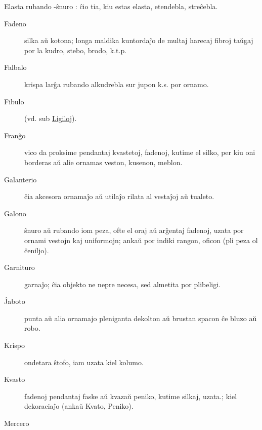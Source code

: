 Elasta rubando -ŝnuro : ĉio tia, kiu estas elasta, etendebla, streĉebla.

\begin{description}
\item[Fadeno]

 silka aŭ kotona; longa maldika kuntordaĵo de multaj harecaj fibroj taŭgaj por la kudro, stebo, brodo, k.t.p.

\item[Falbalo]

 krispa larĝa rubando alkudrebla sur jupon k.s. por ornamo.

\item[Fibulo]

 (vd. sub \hyperlink{Ligoj}{Ligiloj}).

\item[Franĝo]

 vico da proksime pendantaj kvastetoj, fadenoj, kutime el silko, per kiu oni borderas aŭ alie ornamas veston, kusenon, meblon.

\item[Galanterio]

 ĉia akcesora ornamaĵo aŭ utilaĵo rilata al vestaĵoj aŭ tualeto.

\item[Galono]

 ŝnuro aŭ rubando iom peza, ofte el oraj aŭ arĝentaj fadenoj, uzata por ornami vestojn kaj uniformojn; ankaŭ por indiki rangon, oficon (pli peza ol ĉeniljo).

\item[Garnituro]

 garnaĵo; ĉia objekto ne nepre necesa, sed almetita por plibeligi.

\item[Ĵaboto]

 punta aŭ alia ornamajo pleniganta dekolton aŭ brustan spacon ĉe bluzo aŭ robo.

\item[Krispo]

 ondetara ŝtofo, iam uzata kiel kolumo.

\item[Kvasto]

 fadenoj pendantaj faske aŭ kvazaŭ peniko, kutime silkaj, uzata.; kiel dekoraciaĵo (ankaŭ Kvato, Peniko).

\item[Mercero]


\end{description}
